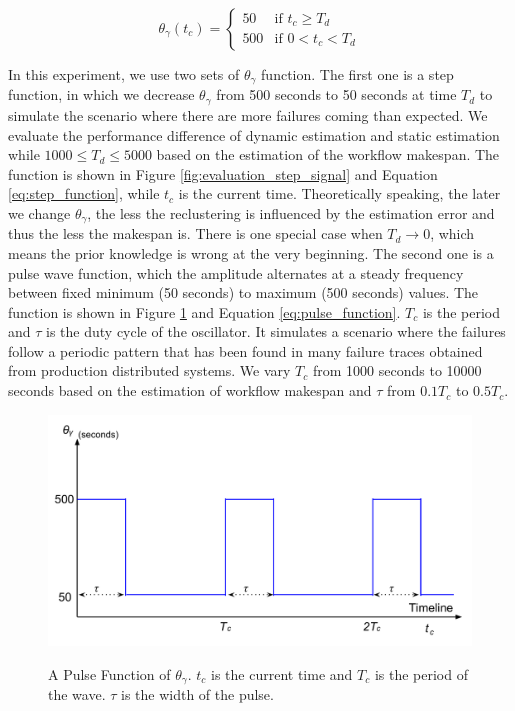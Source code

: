 \begin{equation}
\label{eq:step_function}
 \theta_{\gamma}(t_c) =
  \begin{cases}
   50 & \text{if } t_c \geq T_d \\
   500       & \text{if } 0< t_c < T_d
  \end{cases}
\end{equation}

In this experiment, we use two sets of $\theta_{\gamma}$ function. The first one is a step function, in which we decrease $\theta_{\gamma}$ from 500 seconds to 50 seconds at time $T_d$ to simulate the scenario where there are more failures coming than expected. We evaluate the performance difference of dynamic estimation and static estimation while $1000\leq T_d\leq 5000$ based on the estimation of the workflow makespan. The function is shown  in Figure \ref{fig:evaluation_step_signal} and Equation \ref{eq:step_function}, while $t_c$ is the current time. Theoretically speaking, the later we change $\theta_{\gamma}$, the less the reclustering is influenced by the estimation error and thus the less the makespan is. There is one special case when $T_d\to 0$, which means the prior knowledge is wrong at the very beginning. The second one is a pulse wave function, which the amplitude alternates at a steady frequency between fixed minimum (50 seconds) to maximum (500 seconds) values. The function is shown in Figure \ref{fig:evaluation_pulse_signal} and Equation \ref{eq:pulse_function}. $T_c$ is the period and $\tau$ is the duty cycle of the oscillator. It simulates a scenario where the failures follow a periodic pattern \cite{yigitbasi2010analysis} that has been found in many failure traces obtained from production distributed systems. We vary $T_c$ from 1000 seconds to 10000 seconds based on the estimation of workflow makespan and $\tau$ from $0.1T_c$ to $0.5T_c$. 


\begin{figure}[htb]
	\centering
	\includegraphics[width=0.8\linewidth]{figures/tolerance/pulse_signal.pdf} \\
	\caption{A Pulse Function of $\theta_{\gamma}$. $t_c$ is the current time and $T_c$ is the period of the wave. $\tau$ is the width of the pulse. }
	\label{fig:evaluation_pulse_signal}
\end{figure}


